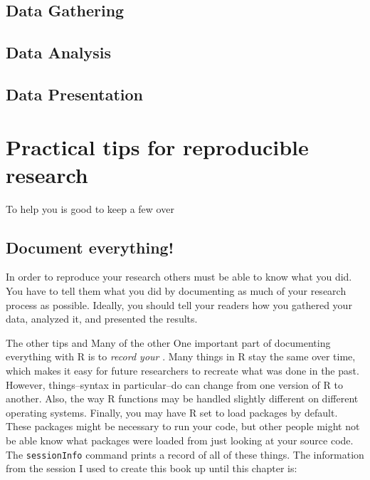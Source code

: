\documentclass[ChapterTOCs,krantz1]{krantz}\usepackage{graphicx, color}
\begin{document}
\subsection{Data Gathering}

\subsection{Data Analysis}

\subsection{Data Presentation}

\section{Practical tips for reproducible research}

To help you  is good to keep a few over

\subsection{Document everything!}

In order to reproduce your research others must be able to know what you did. You have to tell them what you did by documenting as much of your research process as possible. Ideally, you should tell your readers how you gathered your data, analyzed it, and presented the results.

The other tips and Many of the other One important part of documenting everything with R is to \emph{record your }. Many things in R stay the same over time, which makes it easy for future researchers to recreate what was done in the past. However, things--syntax in particular--do can change from one version of R to another. Also, the way R functions may be handled slightly different on different operating systems. Finally, you may have R set to load packages by default. These packages might be necessary to run your code, but other people might not be able know what packages were loaded from just looking at your source code. The \texttt{sessionInfo} command prints a record of all of these things. The information from the session I used to create this book up until this chapter is:
\end{document}
